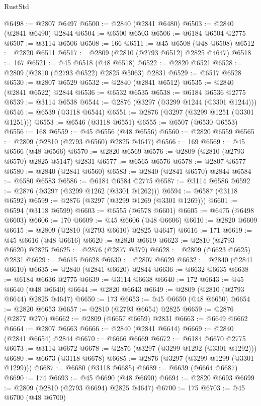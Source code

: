 \begin{lexlean}{RustStd}
\begin{coremodule}
{\begin{coremodule}
{{{{{{{{{{{{{{{{{{{{{{{{{{{{{{{{{@6498 := @2807 @6497
@6500 := @2840 (@2841 @6480)
@6503 := @2840 (@2841 @6490) @2844
@6504 := @6500 @6503
@6506 := @6184 @6504 @2775
@6507 := @3114 @6506
@6508 := 166
@6511 := @45 @6508 (@48 @6508)
@6512 := @2820 @6511
@6517 := @2809 (@2810 (@2793 @6512) @2825 @4647)
@6518 := 167
@6521 := @45 @6518 (@48 @6518)
@6522 := @2820 @6521
@6528 := @2809 (@2810 (@2793 @6522) @2825 @5063) @2831
@6529 := @6517 @6528
@6530 := @2807 @6529
@6532 := @2840 (@2841 @6512)
@6535 := @2840 (@2841 @6522) @2844
@6536 := @6532 @6535
@6538 := @6184 @6536 @2775
@6539 := @3114 @6538
@6544 := @2876 (@3297 (@3299 @1244 (@3301 @1244)))
@6546 := @6539 (@3118 @6544)
@6551 := @2876 (@3297 (@3299 @1251 (@3301 @1251)))
@6553 := @6546 (@3118 @6551)
@6555 := @6507 (@6530 @6553)
@6556 := 168
@6559 := @45 @6556 (@48 @6556)
@6560 := @2820 @6559
@6565 := @2809 (@2810 (@2793 @6560) @2825 @4647)
@6566 := 169
@6569 := @45 @6566 (@48 @6566)
@6570 := @2820 @6569
@6576 := @2809 (@2810 (@2793 @6570) @2825 @5147) @2831
@6577 := @6565 @6576
@6578 := @2807 @6577
@6580 := @2840 (@2841 @6560)
@6583 := @2840 (@2841 @6570) @2844
@6584 := @6580 @6583
@6586 := @6184 @6584 @2775
@6587 := @3114 @6586
@6592 := @2876 (@3297 (@3299 @1262 (@3301 @1262)))
@6594 := @6587 (@3118 @6592)
@6599 := @2876 (@3297 (@3299 @1269 (@3301 @1269)))
@6601 := @6594 (@3118 @6599)
@6603 := @6555 (@6578 @6601)
@6605 := @6475 (@6498 @6603)
@6606 := 170
@6609 := @45 @6606 (@48 @6606)
@6610 := @2820 @6609
@6615 := @2809 (@2810 (@2793 @6610) @2825 @4647)
@6616 := 171
@6619 := @45 @6616 (@48 @6616)
@6620 := @2820 @6619
@6623 := @2810 (@2793 @6620) @2825
@6625 := @2876 (@2877 @379)
@6628 := @2809 (@6623 @6625) @2831
@6629 := @6615 @6628
@6630 := @2807 @6629
@6632 := @2840 (@2841 @6610)
@6635 := @2840 (@2841 @6620) @2844
@6636 := @6632 @6635
@6638 := @6184 @6636 @2775
@6639 := @3114 @6638
@6640 := 172
@6643 := @45 @6640 (@48 @6640)
@6644 := @2820 @6643
@6649 := @2809 (@2810 (@2793 @6644) @2825 @4647)
@6650 := 173
@6653 := @45 @6650 (@48 @6650)
@6654 := @2820 @6653
@6657 := @2810 (@2793 @6654) @2825
@6659 := @2876 (@2877 @270)
@6662 := @2809 (@6657 @6659) @2831
@6663 := @6649 @6662
@6664 := @2807 @6663
@6666 := @2840 (@2841 @6644)
@6669 := @2840 (@2841 @6654) @2844
@6670 := @6666 @6669
@6672 := @6184 @6670 @2775
@6673 := @3114 @6672
@6678 := @2876 (@3297 (@3299 @1292 (@3301 @1292)))
@6680 := @6673 (@3118 @6678)
@6685 := @2876 (@3297 (@3299 @1299 (@3301 @1299)))
@6687 := @6680 (@3118 @6685)
@6689 := @6639 (@6664 @6687)
@6690 := 174
@6693 := @45 @6690 (@48 @6690)
@6694 := @2820 @6693
@6699 := @2809 (@2810 (@2793 @6694) @2825 @4647)
@6700 := 175
@6703 := @45 @6700 (@48 @6700)
}}}}}}}}}}}}}}}}}}}}}}}}}}}}}}}}}
\end{coremodule}}
\end{coremodule}
\end{lexlean}
